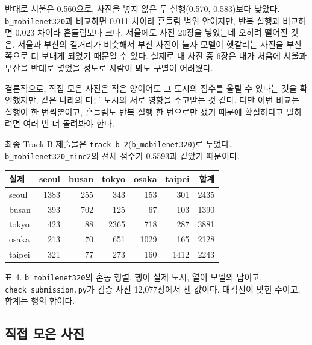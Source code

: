 \documentclass[11pt]{article}
\begin{document}
반대로 서울은 0.560으로, 사진을 넣지 않은 두 실행(0.570, 0.583)보다 낮았다.
\texttt{b\_mobilenet320}과 비교하면 0.011 차이라 흔들림 범위 안이지만, 반복 실행과 비교하면
0.023 차이라 흔들림보다 크다. 서울에도 사진 20장을 넣었는데 오히려 떨어진 것은, 서울과
부산의 길거리가 비슷해서 부산 사진이 늘자 모델이 헷갈리는 사진을 부산 쪽으로 더 보내게
되었기 때문일 수 있다. 실제로 내 사진 중 6장은 내가 처음에 서울과 부산을 반대로 넣었을
정도로 사람이 봐도 구별이 어려웠다.

결론적으로, 직접 모은 사진은 적은 양이어도 그 도시의 점수를 올릴 수 있다는 것을 확인했지만,
같은 나라의 다른 도시와 서로 영향을 주고받는 것 같다. 다만 이번 비교는 실행이 한 번씩뿐이고,
흔들림도 반복 실행 한 번으로만 쟀기 때문에 확실하다고 말하려면 여러 번 더 돌려봐야 한다.

최종 Track B 제출물은 \texttt{track-b-2}(\texttt{b\_mobilenet320})로 두었다.
\texttt{b\_mobilenet320\_mine2}의 전체 점수가 0.5593과 같았기 때문이다.

\begin{center}\footnotesize
\begin{tabular}{lrrrrrr}
\toprule
실제 & seoul & busan & tokyo & osaka & taipei & 합계 \\
\midrule
seoul & 1383 & 255 & 343 & 153 & 301 & 2435 \\
busan & 393 & 702 & 125 & 67 & 103 & 1390 \\
tokyo & 423 & 88 & 2365 & 718 & 287 & 3881 \\
osaka & 213 & 70 & 651 & 1029 & 165 & 2128 \\
taipei & 321 & 77 & 273 & 160 & 1412 & 2243 \\
\bottomrule
\end{tabular}

{\footnotesize 표 4. \texttt{b\_mobilenet320}의 혼동 행렬. 행이 실제 도시, 열이 모델의 답이고, \texttt{check\_submission.py}가 검증 사진 12,077장에서 센 값이다. 대각선이 맞힌 수이고, 합계는 행의 합이다.}
\end{center}

\subsection*{직접 모은 사진}
\end{document}
